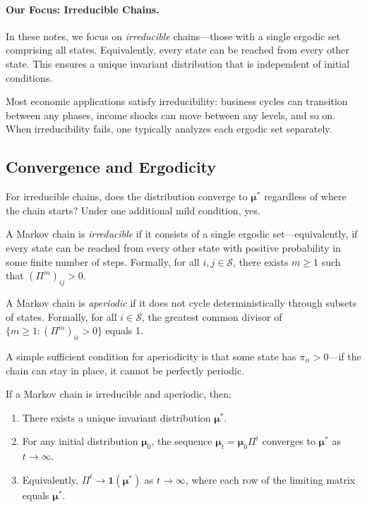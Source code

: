 \paragraph{Our Focus: Irreducible Chains.}
In these notes, we focus on \emph{irreducible} chains---those with a single ergodic set comprising all states. Equivalently, every state can be reached from every other state. This ensures a unique invariant distribution that is independent of initial conditions.

Most economic applications satisfy irreducibility: business cycles can transition between any phases, income shocks can move between any levels, and so on. When irreducibility fails, one typically analyzes each ergodic set separately.

\subsection{Convergence and Ergodicity}
\label{subsec:ergodicity}

For irreducible chains, does the distribution converge to $\boldsymbol{\mu}^*$ regardless of where the chain starts? Under one additional mild condition, yes.

\begin{definition}[Irreducibility]
\label{def:irreducible}
A Markov chain is \emph{irreducible} if it consists of a single ergodic set---equivalently, if every state can be reached from every other state with positive probability in some finite number of steps. Formally, for all $i, j \in \mathcal{S}$, there exists $m \geq 1$ such that $(\Pi^m)_{ij} > 0$.
\end{definition}

\begin{definition}[Aperiodicity]
\label{def:aperiodic}
A Markov chain is \emph{aperiodic} if it does not cycle deterministically through subsets of states. Formally, for all $i \in \mathcal{S}$, the greatest common divisor of $\{m \geq 1 : (\Pi^m)_{ii} > 0\}$ equals 1.
\end{definition}

A simple sufficient condition for aperiodicity is that some state has $\pi_{ii} > 0$---if the chain can stay in place, it cannot be perfectly periodic.

\begin{theorem}
\label{thm:convergence}
If a Markov chain is irreducible and aperiodic, then:
\begin{enumerate}[label=(\roman*)]
\item There exists a unique invariant distribution $\boldsymbol{\mu}^*$.
\item For any initial distribution $\boldsymbol{\mu}_0$, the sequence $\boldsymbol{\mu}_t = \boldsymbol{\mu}_0 \Pi^t$ converges to $\boldsymbol{\mu}^*$ as $t \to \infty$.
\item Equivalently, $\Pi^t \to \mathbf{1} (\boldsymbol{\mu}^*)$ as $t \to \infty$, where each row of the limiting matrix equals $\boldsymbol{\mu}^*$.
\end{enumerate}
\end{theorem}


